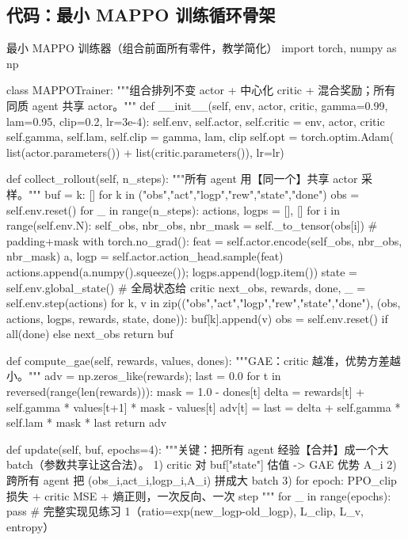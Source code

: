 \subsection{代码：最小 MAPPO 训练循环骨架}
\label{sec:mc-train-code}

\begin{codebox}[Python]{最小 MAPPO 训练器（组合前面所有零件，教学简化）}
import torch, numpy as np

class MAPPOTrainer:
    """组合排列不变 actor + 中心化 critic + 混合奖励；所有同质 agent 共享 actor。"""
    def __init__(self, env, actor, critic, gamma=0.99, lam=0.95, clip=0.2, lr=3e-4):
        self.env, self.actor, self.critic = env, actor, critic
        self.gamma, self.lam, self.clip = gamma, lam, clip
        self.opt = torch.optim.Adam(
            list(actor.parameters()) + list(critic.parameters()), lr=lr)

    def collect_rollout(self, n_steps):
        """所有 agent 用【同一个】共享 actor 采样。"""
        buf = {k: [] for k in ("obs","act","logp","rew","state","done")}
        obs = self.env.reset()
        for _ in range(n_steps):
            actions, logps = [], []
            for i in range(self.env.N):
                self_obs, nbr_obs, nbr_mask = self._to_tensor(obs[i])  # padding+mask
                with torch.no_grad():
                    feat = self.actor.encode(self_obs, nbr_obs, nbr_mask)
                    a, logp = self.actor.action_head.sample(feat)
                actions.append(a.numpy().squeeze()); logps.append(logp.item())
            state = self.env.global_state()              # 全局状态给 critic
            next_obs, rewards, done, _ = self.env.step(actions)
            for k, v in zip(("obs","act","logp","rew","state","done"),
                            (obs, actions, logps, rewards, state, done)):
                buf[k].append(v)
            obs = self.env.reset() if all(done) else next_obs
        return buf

    def compute_gae(self, rewards, values, dones):
        """GAE：critic 越准，优势方差越小。"""
        adv = np.zeros_like(rewards); last = 0.0
        for t in reversed(range(len(rewards))):
            mask = 1.0 - dones[t]
            delta = rewards[t] + self.gamma * values[t+1] * mask - values[t]
            adv[t] = last = delta + self.gamma * self.lam * mask * last
        return adv

    def update(self, buf, epochs=4):
        """关键：把所有 agent 经验【合并】成一个大 batch（参数共享让这合法）。
        1) critic 对 buf["state"] 估值 -> GAE 优势 A_i
        2) 跨所有 agent 把 (obs_i,act_i,logp_i,A_i) 拼成大 batch
        3) for epoch: PPO_clip 损失 + critic MSE + 熵正则，一次反向、一次 step
        """
        for _ in range(epochs):
            pass    # 完整实现见练习 1（ratio=exp(new_logp-old_logp), L_clip, L_v, entropy）


\end{codebox}
